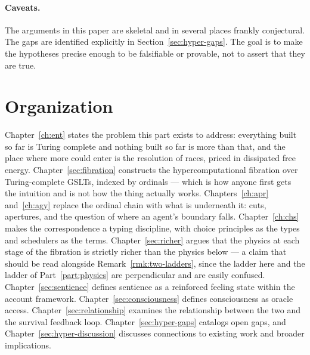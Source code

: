 \paragraph{Caveats.}
The arguments in this paper are skeletal and in several places
frankly conjectural.
The gaps are identified explicitly in Section~\ref{sec:hyper-gaps}.
The goal is to make the hypotheses precise enough to be falsifiable
or provable, not to assert that they are true.

\section{Organization}

Chapter~\ref{ch:ent} states the problem this part exists to address:
everything built so far is Turing complete and nothing built so far is
more than that, and the place where more could enter is the resolution of
races, priced in dissipated free energy.
Chapter~\ref{sec:fibration} constructs the hypercomputational fibration
over Turing-complete GSLTs, indexed by ordinals --- which is how anyone
first gets the intuition and is not how the thing actually works.
Chapters~\ref{ch:apr} and~\ref{ch:agy} replace the ordinal chain with
what is underneath it: cuts, apertures, and the question of where an
agent's boundary falls.
Chapter~\ref{ch:chs} makes the correspondence a typing discipline, with
choice principles as the types and schedulers as the terms.
Chapter~\ref{sec:richer} argues that the physics at each stage of the
fibration is strictly richer than the physics below --- a claim that
should be read alongside Remark~\ref{rmk:two-ladders}, since the ladder
here and the ladder of Part~\ref{part:physics} are perpendicular and are
easily confused.
Chapter~\ref{sec:sentience} defines sentience as a reinforced feeling
state within the account framework.
Chapter~\ref{sec:consciousness} defines consciousness as oracle access.
Chapter~\ref{sec:relationship} examines the relationship between the two
and the survival feedback loop.
Chapter~\ref{sec:hyper-gaps} catalogs open gaps, and
Chapter~\ref{sec:hyper-discussion} discusses connections to existing work
and broader implications.

